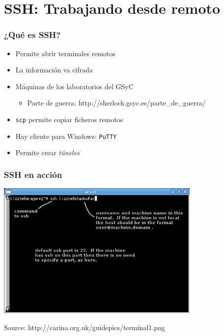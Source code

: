 

\section{SSH: Trabajando desde remoto}



\begin{frame}
\frametitle{¿Qué es SSH?}

\begin{itemize}
   \item Permite abrir terminales remotos
   \item La información va cifrada
   \item Máquinas de los laboratorios del GSyC
   \begin{itemize}
     \item Parte de guerra: http://sherlock.gsyc.es/parte\_de\_guerra/
   \end{itemize}
   \item \texttt{scp} permite copiar ficheros remotos
   \item Hay cliente para Windows: \texttt{PuTTY}
   \item Permite crear \emph{túneles}
\end{itemize}

\end{frame}



\begin{frame}
\frametitle{SSH en acción}

\begin{center}
  \includegraphics[width=10cm]{figs/terminal.png}
\end{center}


\begin{flushright}
{\tiny
Source: http://carina.org.uk/guidepics/terminal1.png
}
\end{flushright}

\end{frame}



